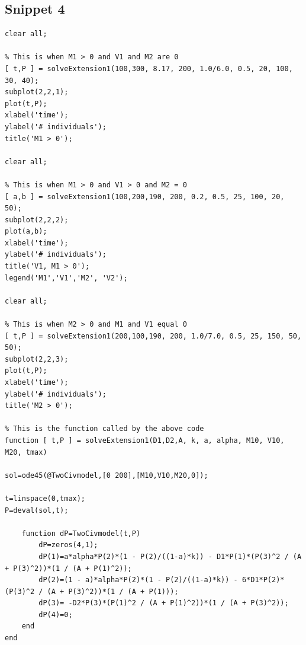 \documentclass[12pt]{article}
\begin{document}
\subsection{Snippet 4}
\begin{verbatim}
clear all;

% This is when M1 > 0 and V1 and M2 are 0
[ t,P ] = solveExtension1(100,300, 8.17, 200, 1.0/6.0, 0.5, 20, 100, 30, 40);
subplot(2,2,1);
plot(t,P);
xlabel('time');
ylabel('# individuals');
title('M1 > 0');

clear all;

% This is when M1 > 0 and V1 > 0 and M2 = 0
[ a,b ] = solveExtension1(100,200,190, 200, 0.2, 0.5, 25, 100, 20, 50);
subplot(2,2,2);
plot(a,b);
xlabel('time');
ylabel('# individuals');
title('V1, M1 > 0');
legend('M1','V1','M2', 'V2');

clear all;

% This is when M2 > 0 and M1 and V1 equal 0
[ t,P ] = solveExtension1(200,100,190, 200, 1.0/7.0, 0.5, 25, 150, 50, 50);
subplot(2,2,3);
plot(t,P);
xlabel('time');
ylabel('# individuals');
title('M2 > 0');

% This is the function called by the above code
function [ t,P ] = solveExtension1(D1,D2,A, k, a, alpha, M10, V10, M20, tmax)

sol=ode45(@TwoCivmodel,[0 200],[M10,V10,M20,0]);

t=linspace(0,tmax);
P=deval(sol,t);

    function dP=TwoCivmodel(t,P)
        dP=zeros(4,1);     
        dP(1)=a*alpha*P(2)*(1 - P(2)/((1-a)*k)) - D1*P(1)*(P(3)^2 / (A + P(3)^2))*(1 / (A + P(1)^2));
        dP(2)=(1 - a)*alpha*P(2)*(1 - P(2)/((1-a)*k)) - 6*D1*P(2)*(P(3)^2 / (A + P(3)^2))*(1 / (A + P(1)));
        dP(3)= -D2*P(3)*(P(1)^2 / (A + P(1)^2))*(1 / (A + P(3)^2));
        dP(4)=0;
    end
end
\end{verbatim}
\end{document}
